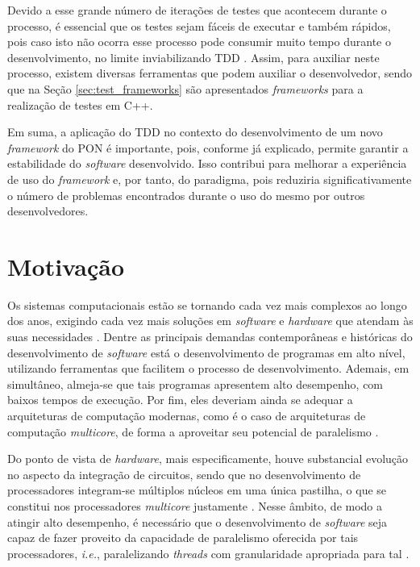 Devido a esse grande número de iterações de testes que acontecem durante o
processo, é essencial que os testes sejam fáceis de executar e também rápidos,
pois caso isto não ocorra esse processo pode consumir muito tempo durante o
desenvolvimento, no limite inviabilizando TDD \cite{test_driven_2013}. Assim,
para auxiliar neste processo, existem diversas ferramentas que podem auxiliar o
desenvolvedor, sendo que na Seção \ref{sec:test_frameworks} são apresentados
\textit{frameworks} para a realização de testes em C++.

Em suma, a aplicação do TDD no contexto do desenvolvimento de um novo
\textit{framework} do PON é importante, pois, conforme já explicado, permite
garantir a estabilidade do \textit{software} desenvolvido. Isso contribui para
melhorar a experiência de uso do \textit{framework} e, por tanto, do paradigma,
pois reduziria significativamente o número de problemas encontrados durante o
uso do mesmo por outros desenvolvedores.

\section{Motivação}\label{sec:motiv}



Os sistemas computacionais estão se tornando cada vez mais complexos ao longo
dos anos, exigindo cada vez mais soluções em \textit{software} e
\textit{hardware} que atendam às suas necessidades \cite{chien_2011,
quali_pordeus_2020}. Dentre as principais demandas contemporâneas e históricas
do desenvolvimento de \textit{software} está o desenvolvimento de programas em
alto nível, utilizando ferramentas que facilitem o processo de desenvolvimento.
Ademais, em simultâneo, almeja-se que tais programas apresentem alto desempenho,
com baixos tempos de execução. Por fim, eles deveriam ainda se adequar a
arquiteturas de computação modernas, como é o caso de arquiteturas de computação
\textit{multicore}, de forma a aproveitar seu potencial de paralelismo
\cite{belmonte_2016}.

Do ponto de vista de \textit{hardware}, mais especificamente, houve substancial
evolução no aspecto da integração de circuitos, sendo que no desenvolvimento de
processadores integram-se múltiplos núcleos em uma única pastilha, o que se
constitui nos processadores \textit{multicore} justamente
\cite{asanovic_2009,chien_2011, quali_pordeus_2020}. Nesse âmbito, de modo a
atingir alto desempenho, é necessário que o desenvolvimento de \textit{software}
seja capaz de fazer proveito da capacidade de paralelismo oferecida por tais
processadores, \textit{i.e.}, paralelizando \textit{threads} com granularidade
apropriada para tal
\cite{henessy_2003,doc_linhares_2015,belmonte_2016,msc_negrini_2019}.

